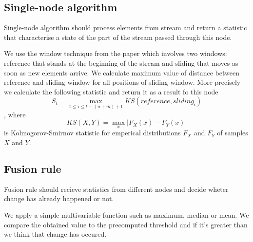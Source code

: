 \subsection{Single-node algorithm}

Single-node algorithm should process elements from stream and return a statistic that characterise a state of the part of the stream passed through this node.

We use the window technique from the paper \cite{kifer2004detecting} which involves two windows: reference that stands at the beginning of the stream and sliding that moves as soon as new elements arrive. We calculate maximum value of distance between reference and sliding window for all positions of sliding window. More precisely we calculate the following statistic and return it as a result fo this node $$S_t = \max_{1 \le i \le t - (n + m) + 1} KS(reference, sliding_i)$$, where $$KS(X, Y) = \max_x \left|F_X(x) - F_Y(x)\right|$$ is Kolmogorov-Smirnov statistic for emperical distributions $F_X$ and $F_Y$ of samples $X$ and $Y$.

\subsection{Fusion rule}

Fusion rule should recieve statistics from different nodes and decide wheter change has already happened or not.

We apply a simple multivariable function such as maximum, median or mean. We compare the obtained value to the precomputed threshold and if it's greater than we think that change has occured.

